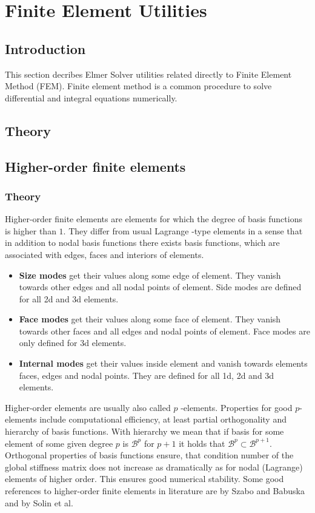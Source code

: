 \chapter{Finite Element Utilities}
\noindent

\section{Introduction}

This section decribes Elmer Solver utilities related directly to Finite Element Method (FEM).
Finite element method is a common procedure to solve differential and integral equations numerically.


\section{Theory}


\section{Higher-order finite elements}

\subsection{Theory}

Higher-order finite elements are elements for which the degree of basis functions is higher than $1$. They differ from usual Lagrange -type elements in a sense that in addition to nodal basis functions there exists basis functions, which are associated with edges, faces and interiors of elements.

\begin{itemize}
\item \textbf{Size modes} get their values along some edge of element. They vanish towards other edges and all nodal points of element. Side modes are defined for all 2d and 3d elements. 
\item \textbf{Face modes} get their values along some face of element. They vanish towards other faces and all edges and nodal points of element. Face modes are only defined for 3d elements. 
\item \textbf{Internal modes} get their values inside element and vanish towards elements faces, edges and nodal points. They are defined for all 1d, 2d and 3d elements. 
\end{itemize}

Higher-order elements are usually also called $p$ -elements. Properties for good $p$-elements include computational efficiency, at least partial orthogonality and hierarchy of basis functions. With hierarchy we mean that if basis for some element of some given degree $p$ is $\mathcal{B}^p$ for $p+1$ it holds that $\mathcal{B}^p \subset \mathcal{B}^{p+1}$. Orthogonal properties of basis functions ensure, that condition number of the global stiffness matrix does not increase as dramatically as for nodal (Lagrange) elements of higher order. This ensures good numerical stability. Some good references to higher-order finite elements in literature are \cite{SzaboBabu} by Szabo and Babuska and \cite{Solin} by Solin et al. 

